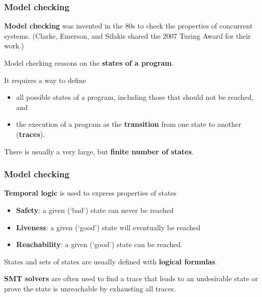 \documentclass[compress,dvipdfmx]{beamer}
\begin{document}
\begin{frame}
  \frametitle{Model checking}

  \textbf{Model checking} was invented in the 80s to check the
  properties of concurrent systems.  (Clarke, Emerson, and Sifakis
  shared the 2007 Turing Award for their work.)

  \bigskip

  Model checking reasons on the \textbf{states of a program}.

  \bigskip

  It requires a way to define
  \begin{itemize}

    \item all possible states of a program, including those that
      should not be reached, and

    \item the execution of a program as the \textbf{transition} from
      one state to another (\textbf{traces}).

  \end{itemize}

  \medskip

  There is usually a very large, but \textbf{finite number of states}.

\end{frame}


\begin{frame}
  \frametitle{Model checking}

  \textbf{Temporal logic} is used to express properties of states
  \begin{itemize}

    \item \textbf{Safety}: a given (`bad') state can never be
      reached

    \item \textbf{Liveness}: a given (`good') state will eventually
      be reached

    \item \textbf{Reachability}: a given (`good') state can be
      reached.

  \end{itemize}

  \medskip

  States and sets of states are usually defined with \textbf{logical
    formulas}.

  \bigskip

  \textbf{SMT solvers} are often used to find a trace that leads to an
  undesirable state or prove the state is unreachable by exhausting
  all traces.

\end{frame}
\end{document}
